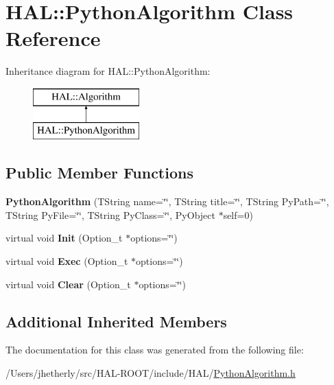 \hypertarget{class_h_a_l_1_1_python_algorithm}{\section{H\+A\+L\+:\+:Python\+Algorithm Class Reference}
\label{class_h_a_l_1_1_python_algorithm}
}
Inheritance diagram for H\+A\+L\+:\+:Python\+Algorithm\+:\begin{figure}[H]
\begin{center}
\leavevmode
\includegraphics[height=2.000000cm]{class_h_a_l_1_1_python_algorithm}
\end{center}
\end{figure}
\subsection*{Public Member Functions}
\begin{DoxyCompactItemize}
\item 
\hypertarget{class_h_a_l_1_1_python_algorithm_a91ca9d7b2a002013b5dd27951aca3678}{{\bfseries Python\+Algorithm} (T\+String name=\char`\"{}\char`\"{}, T\+String title=\char`\"{}\char`\"{}, T\+String Py\+Path=\char`\"{}\char`\"{}, T\+String Py\+File=\char`\"{}\char`\"{}, T\+String Py\+Class=\char`\"{}\char`\"{}, Py\+Object $\ast$self=0)}\label{class_h_a_l_1_1_python_algorithm_a91ca9d7b2a002013b5dd27951aca3678}

\item 
\hypertarget{class_h_a_l_1_1_python_algorithm_a951c827d0f926b5096f7e59accc1e007}{virtual void {\bfseries Init} (Option\+\_\+t $\ast$options=\char`\"{}\char`\"{})}\label{class_h_a_l_1_1_python_algorithm_a951c827d0f926b5096f7e59accc1e007}

\item 
\hypertarget{class_h_a_l_1_1_python_algorithm_a64a70202dd5da390ab6654a7e33c5976}{virtual void {\bfseries Exec} (Option\+\_\+t $\ast$options=\char`\"{}\char`\"{})}\label{class_h_a_l_1_1_python_algorithm_a64a70202dd5da390ab6654a7e33c5976}

\item 
\hypertarget{class_h_a_l_1_1_python_algorithm_aac72e398eadd979cf62617fe2fbe1a01}{virtual void {\bfseries Clear} (Option\+\_\+t $\ast$options=\char`\"{}\char`\"{})}\label{class_h_a_l_1_1_python_algorithm_aac72e398eadd979cf62617fe2fbe1a01}

\end{DoxyCompactItemize}
\subsection*{Additional Inherited Members}


The documentation for this class was generated from the following file\+:\begin{DoxyCompactItemize}
\item 
/\+Users/jhetherly/src/\+H\+A\+L-\/\+R\+O\+O\+T/include/\+H\+A\+L/\hyperlink{_python_algorithm_8h}{Python\+Algorithm.\+h}\end{DoxyCompactItemize}
